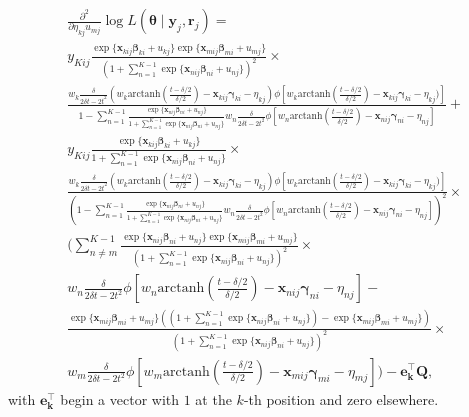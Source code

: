 \documentclass[12pt, %
               openright, %
               oneside, %
               a4paper, %
               chapter=TITLE, %
               section=TITLE, %
               brazil,
               english %
]{abntex2}
\begin{document}
\begin{apendicesenv}
\begin{align*}
  &\frac{\partial^{2}}{\partial \eta_{kj} u_{mj}}
    \log L(\bm{\theta}\mid\bm{y}_{j}, \bm{r}_{j}) =\\
  &y_{Kij}
    \frac{\exp\{\bm{x}_{kij}\bm{\beta}_{ki} + u_{kj}\}
    \exp\{\bm{x}_{mij}\bm{\beta}_{mi} + u_{mj}\}}{
    \left(1 +
    \sum_{n = 1}^{K-1}\exp\{\bm{x}_{nij}\bm{\beta}_{ni} + u_{nj}\}
    \right)^{2}}\times\\
  &\frac{
    w_{k}\frac{\delta}{2\delta t - 2t^{2}}
    (w_{k} \text{arctanh}\left(\frac{t-\delta/2}{\delta/2}\right)
    - \bm{x}_{kij}\bm{\gamma}_{ki} - \eta_{kj})
    \phi[w_{k}\text{arctanh}\left(\frac{t-\delta/2}{\delta/2}\right)
    - \bm{x}_{kij}\bm{\gamma}_{ki} - \eta_{kj})]}{1 - \sum_{n = 1}^{K-1}
    \frac{\exp\{\bm{x}_{nij}\bm{\beta}_{ni} + u_{nj}\}}{1 +
    \sum_{n = 1}^{K-1}\exp\{\bm{x}_{nij}\bm{\beta}_{ni} + u_{nj}\}}
    w_{n}\frac{\delta}{2\delta t - 2t^{2}}
    \phi[w_{n}\text{arctanh}\left(\frac{t-\delta/2}{\delta/2}\right)
    - \bm{x}_{nij}\bm{\gamma}_{ni} - \eta_{nj}]} +\\
  &y_{Kij}
    \frac{\exp\{\bm{x}_{kij}\bm{\beta}_{ki} + u_{kj}\}}{1 +
    \sum_{n = 1}^{K-1}\exp\{\bm{x}_{nij}\bm{\beta}_{ni} + u_{nj}\}}\times\\
  &\frac{
    w_{k}\frac{\delta}{2\delta t - 2t^{2}}
    (w_{k}\text{arctanh}\left(\frac{t-\delta/2}{\delta/2}\right)
    - \bm{x}_{kij}\bm{\gamma}_{ki} - \eta_{kj})
    \phi[w_{k}\text{arctanh}\left(\frac{t-\delta/2}{\delta/2}\right)
    - \bm{x}_{kij}\bm{\gamma}_{ki} - \eta_{kj})]}{
    \left(1 - \sum_{n = 1}^{K-1}
    \frac{\exp\{\bm{x}_{nij}\bm{\beta}_{ni} + u_{nj}\}}{1 +
    \sum_{n = 1}^{K-1}\exp\{\bm{x}_{nij}\bm{\beta}_{ni} + u_{nj}\}}
    w_{n}\frac{\delta}{2\delta t - 2t^{2}}
    \phi[w_{n}\text{arctanh}\left(\frac{t-\delta/2}{\delta/2}\right)
    - \bm{x}_{nij}\bm{\gamma}_{ni} - \eta_{nj}]\right)^{2}}\times\\
  &\Bigg(
    \sum_{n \neq m}^{K-1}\frac{
    \exp\{\bm{x}_{nij}\bm{\beta}_{ni} + u_{nj}\}
    \exp\{\bm{x}_{mij}\bm{\beta}_{mi} + u_{mj}\}}{
    \left(1 +
    \sum_{n = 1}^{K-1}\exp\{\bm{x}_{nij}\bm{\beta}_{ni} + u_{nj}\}
    \right)^{2}}\times\\
  &w_{n}\frac{\delta}{2\delta t - 2t^{2}}
    \phi[w_{n}\text{arctanh}\left(\frac{t-\delta/2}{\delta/2}\right)
    - \bm{x}_{nij}\bm{\gamma}_{ni} - \eta_{nj}] -\\
  &\frac{\exp\{\bm{x}_{mij}\bm{\beta}_{mi} + u_{mj}\}
    \left(
    \left(1 +
    \sum_{n = 1}^{K-1}\exp\{\bm{x}_{nij}\bm{\beta}_{ni} + u_{nj}\}
    \right) - \exp\{\bm{x}_{mij} \bm{\beta}_{mi} + u_{mj}\}
    \right)}{
    \left(1 + \sum_{n = 1}^{K-1}\exp\{\bm{x}_{nij}\bm{\beta}_{ni} + u_{nj}\}
    \right)^{2}}\times\\
  &w_{m}\frac{\delta}{2\delta t - 2t^{2}}
    \phi[w_{m}\text{arctanh}\left(\frac{t-\delta/2}{\delta/2}\right)
    - \bm{x}_{mij}\bm{\gamma}_{mi} - \eta_{mj}]\Bigg) - \bm{e_{k}^{\top}Q},
\end{align*}
with \(\bm{e_{k}^{\top}}\) begin a vector with \(1\) at the \(k\)-th
position and zero elsewhere.


\end{apendicesenv}
\end{document}
